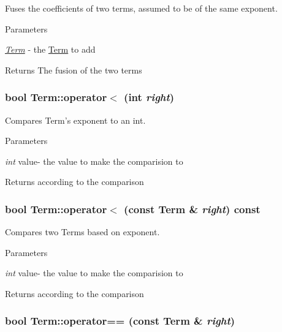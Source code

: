 Fuses the coefficients of two terms, assumed to be of the same exponent. 
\begin{DoxyParams}{Parameters}
\item[{\em \hyperlink{classTerm}{Term}}]-\/ the \hyperlink{classTerm}{Term} to add \end{DoxyParams}
\begin{DoxyReturn}{Returns}
The fusion of the two terms 
\end{DoxyReturn}
\hypertarget{classTerm_a44f5d686c50172e689cf86b2c77bbc6a}{
\subsubsection[{operator$<$}]{\setlength{\rightskip}{0pt plus 5cm}bool Term::operator$<$ (int {\em right})}}
\label{classTerm_a44f5d686c50172e689cf86b2c77bbc6a}


Compares Term's exponent to an int. 
\begin{DoxyParams}{Parameters}
\item[{\em int}]value-\/ the value to make the comparision to \end{DoxyParams}
\begin{DoxyReturn}{Returns}
according to the comparison 
\end{DoxyReturn}
\hypertarget{classTerm_a34755dc6c3b6084fb864bdad671be087}{
\subsubsection[{operator$<$}]{\setlength{\rightskip}{0pt plus 5cm}bool Term::operator$<$ (const {\bf Term} \& {\em right}) const}}
\label{classTerm_a34755dc6c3b6084fb864bdad671be087}


Compares two Terms based on exponent. 
\begin{DoxyParams}{Parameters}
\item[{\em int}]value-\/ the value to make the comparision to \end{DoxyParams}
\begin{DoxyReturn}{Returns}
according to the comparison 
\end{DoxyReturn}
\hypertarget{classTerm_a22d1367b67d2c2d2762392463decde13}{
\subsubsection[{operator==}]{\setlength{\rightskip}{0pt plus 5cm}bool Term::operator== (const {\bf Term} \& {\em right})}}
\label{classTerm_a22d1367b67d2c2d2762392463decde13}


